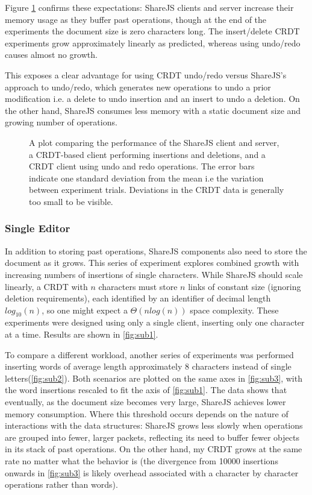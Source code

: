 \documentclass[12pt,a4paper,twoside,openright]{report}
\begin{document}
						Figure \ref{fig:sanitycheck} confirms these expectations: ShareJS clients and server increase their memory usage as they buffer past operations, though at the end of the experiments the document size is zero characters long. The insert/delete CRDT experiments grow approximately linearly as predicted, whereas using undo/redo causes almost no growth. 
						
										
						This exposes a clear advantage for using CRDT undo/redo versus ShareJS's approach to undo/redo, which generates new operations to undo a prior modification i.e. a delete to undo insertion and an insert to undo a deletion. On the other hand, ShareJS consumes less memory with a static document size and growing number of operations.
								
				\begin{figure}[H]
					\centering
					
					\caption[Memory Consumption Sanity Check] {A plot comparing the performance of the ShareJS client and server, a CRDT-based client performing insertions and deletions, and a CRDT client using undo and redo operations. The error bars indicate one standard deviation from the mean i.e the variation between experiment trials. Deviations in the CRDT data is generally too small to be visible.}
					\label{fig:sanitycheck}
				\end{figure}

		
			\subsubsection{Single Editor} \label{sec:singleeditor}
				In addition to storing past operations, ShareJS components also need to store the document as it grows. This series of experiment explores combined growth with increasing numbers of insertions of single characters. While ShareJS should scale linearly, a CRDT with $n$ characters must store $n$ links of constant size (ignoring deletion requirements), each identified by an identifier of decimal length $log_{10}(n)$, so one might expect a $\Theta (nlog(n))$ space complexity. These experiments were designed using only a single client, inserting only one character at a time. Results are shown in \ref{fig:sub1}.
					
				To compare a different workload, another series of experiments was performed inserting words of average length approximately 8 characters instead of single letters(\ref{fig:sub2}). Both scenarios are plotted on the same axes in \ref{fig:sub3}, with the word insertions rescaled to fit the axis of \ref{fig:sub1}. The data shows that eventually, as the document size becomes very large, ShareJS achieves lower memory consumption. Where this threshold occurs depends on the nature of interactions with the data structures: ShareJS grows less slowly when operations are grouped into fewer, larger packets, reflecting its need to buffer fewer objects in its stack of past operations. On the other hand, my CRDT grows at the same rate no matter what the behavior is (the divergence from 10000 insertions onwards in \ref{fig:sub3} is likely overhead associated with a character by character operations rather than words). 
				
\end{document}
